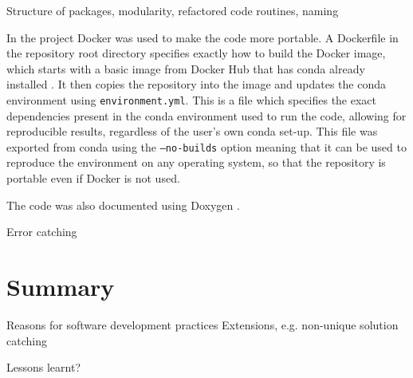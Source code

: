 \documentclass[12pt]{article}
\begin{document}
Structure of packages, modularity, refactored code routines, naming

In the project Docker was used to make the code more portable.
A Dockerfile in the repository root directory specifies exactly how to build the Docker image, which starts with a basic image from Docker Hub that has conda already installed \cite{docker}.
It then copies the repository into the image and updates the conda environment using \texttt{environment.yml}.
This is a file which specifies the exact dependencies present in the conda environment used to run the code, allowing for reproducible results, regardless of the user's own conda set-up.
This file was exported from conda using the \texttt{--no-builds} option meaning that it can be used to reproduce the environment on any operating system, so that the repository is portable even if Docker is not used.

The code was also documented using Doxygen \cite{doxygen}.

Error catching

\section*{Summary}

Reasons for software development practices
Extensions, e.g. non-unique solution catching

Lessons learnt?


\end{document}
